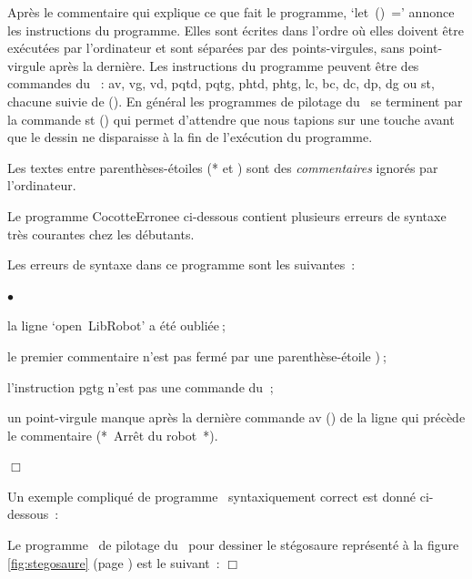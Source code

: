 Après le commentaire qui explique ce que fait le programme,
`{\mcl let}\ {\idt ()\ =}' annonce les instructions 
du programme. Elles sont écrites dans l'ordre où elles doivent être exécutées par
l'or\-di\-na\-teur et sont
séparées par des points-virgules, sans point-virgule après la dernière. 
Les instructions du programme
peuvent être des commandes du \hbox{\robot\ :} {\idt av}, {\idt vg}, {\idt vd}, {\idt pqtd}, 
{\idt pqtg}, {\idt phtd}, {\idt phtg}, {\idt lc}, {\idt bc}, {\idt dc}, {\idt dp}, 
{\idt dg} ou {\idt st}, chacune suivie de {\idt ()}. En général les programmes de pilotage du \robot\ se
terminent par la commande {\idt st ()} qui permet d'attendre que nous
tapions sur une touche avant que le dessin ne 
disparaisse à la fin de l'exécution du programme.

Les textes entre parenthèses-étoiles {\cmt (*} et {\cmt *)} sont des {\em commentaires}
ignorés par l'ordinateur.

Le pro\-gram\-me
\enlargethispage{\baselineskip}%
{\idt CocotteErronee} ci-dessous contient
plusieurs erreurs de syntaxe très courantes chez les débutants.

\begin{exemple}{\hfill

\label{prog:Cocotte-errone} 
\noindent Les erreurs de syntaxe dans ce programme sont les \hbox{suivantes :}
\begin{list}{$\scriptscriptstyle\bullet$}{
\renewcommand{\labelwidth}{3mm}
\renewcommand{\labelsep}{3mm}
\renewcommand{\leftmargin}{10mm}
\renewcommand{\rightmargin}{0mm}
}
\item[1.] la ligne `{\mcl open}\ {\idt LibRobot}' a été oubliée$\:$;
\item[2.] le premier commentaire n'est pas fermé par une
parenthèse-étoile {\cmt *)}$\:$;
\item[3.] l'instruction {\idt pgtg} n'est pas une commande du \robotErr$\:$;
\item[4.] un point-virgule manque après la dernière commande {\idt av ()} de la
ligne qui précède le commentaire {\cmt (*\ Arrêt du robot\ *)}.
\end{list}
\noindent $\Box$ }\end{exemple}


Un exemple compliqué de programme \ocaml\ syntaxiquement correct
est donné ci-\hbox{dessous :}
\begin{exemple}[Le stégosaure]{\rm
Le programme \ocaml\ de pilotage du \robot\ pour
dessiner le sté\-go\-sau\-re re\-pré\-sen\-té  à la fi\-gu\-re
\ref{fig:stegosaure} (page \pageref{fig:stegosaure}) est le \hbox{suivant :}
\label{prog:Stegosaure} 
\noindent $\Box$ }\end{exemple}

